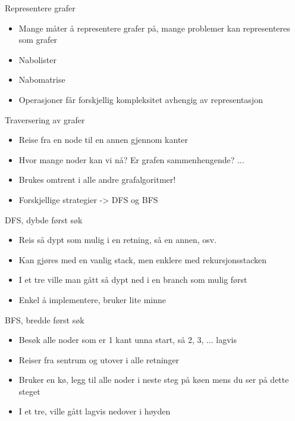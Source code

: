 \documentclass[norsk, handout]{beamer}
\begin{document}
	\begin{frame}{Representere grafer}
		\begin{itemize}
			\item Mange måter å representere grafer på, mange problemer kan representeres
				som grafer
			\item Nabolister
			\item Nabomatrise
			\item Operasjoner får forskjellig kompleksitet avhengig av representasjon
		\end{itemize}
	\end{frame}

	\begin{frame}{Traversering av grafer}
		\begin{itemize}
			\item Reise fra en node til en annen gjennom kanter
			\item Hvor mange noder kan vi nå? Er grafen sammenhengende? ...
			\item Brukes omtrent i alle andre grafalgoritmer!
			\item Forskjellige strategier -> DFS og BFS
		\end{itemize}
	\end{frame}

	\begin{frame}{DFS, dybde først søk}
		\begin{itemize}
			\item Reis så dypt som mulig i en retning, så en annen, osv.
			\item Kan gjøres med en vanlig stack, men enklere med rekursjonsstacken
			\item I et tre ville man gått så dypt ned i en branch som mulig først
			\item Enkel å implementere, bruker lite minne
		\end{itemize}
	\end{frame}

	\begin{frame}{BFS, bredde først søk}
		\begin{itemize}
			\item Besøk alle noder som er 1 kant unna start, så 2, 3, ... lagvis
			\item Reiser fra sentrum og utover i alle retninger
			\item Bruker en kø, legg til alle noder i neste steg på køen mens du ser på
				dette steget
			\item I et tre, ville gått lagvis nedover i høyden
		\end{itemize}
	\end{frame}
\end{document}
